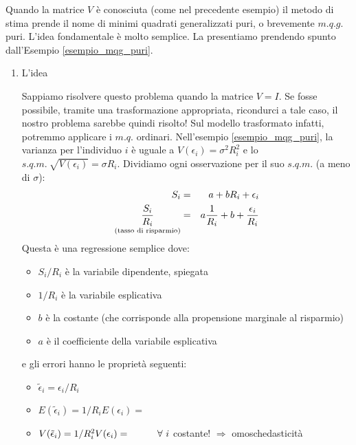 \documentclass[a4paper]{report}
\newcounter{ese}
\theoremstyle{remark}
\begin{document}
Quando la matrice $V$ \`e conosciuta (come nel precedente esempio) il metodo
di stima prende il nome di minimi quadrati generalizzati puri, o brevemente $%
m.q.g.$ puri. L'idea fondamentale \`e molto semplice. La presentiamo
prendendo spunto dall'Esempio \ref{esempio_mqg_puri}.

\begin{enumerate}
\item L'idea

Sappiamo risolvere questo problema quando la matrice $V=I$. Se fosse
possibile, tramite una trasformazione appropriata, ricondurci a tale caso,
il nostro problema sarebbe quindi risolto! Sul modello trasformato infatti,
potremmo applicare i $m.q.$ ordinari. Nell'esempio \ref{esempio_mqg_puri},
la varianza per l'individuo $i$ \`{e} uguale a $V(\epsilon _{i})=\sigma
^{2}R_{i}^{2}$ e lo $s.q.m.\ \sqrt{V(\epsilon _{i})}=\sigma R_{i}$.
Dividiamo ogni osservazione per il suo $s.q.m.$ (a meno di $\sigma $): 
\begin{eqnarray*}
S_{i} &=&a+bR_{i}+\epsilon _{i} \\
\underset{\text{(tasso di risparmio)}}{\frac{S_{i}}{R_{i}}} &=&a\frac{1}{%
R_{i}}+b+\frac{\epsilon _{i}}{R_{i}}
\end{eqnarray*}%
Questa \`{e} una regressione semplice dove:

\begin{itemize}
\item $S_{i}/R_{i}$ \`{e} la variabile dipendente, spiegata

\item $1/R_{i}$ \`{e} la variabile esplicativa

\item $b$ \`{e} la costante (che corrisponde alla propensione marginale al
risparmio)

\item $a$ \`{e} il coefficiente della variabile esplicativa
\end{itemize}

e gli errori hanno le propriet\`{a} seguenti:

\begin{itemize}
\item $\tilde{\epsilon}_{i}=\epsilon _{i}/R_{i}$

\item $E(\tilde{\epsilon}_{i})=1/R_{i}E(\epsilon _{i})=$

\item $V(\tilde{\epsilon}_{i})=1/R_{i}^{2}V(\epsilon _{i})=\hspace*{1cm}%
\forall \ i$ costante! $\Rightarrow $ omoschedasticit\`{a}


\end{itemize}
\end{enumerate}
\end{document}
